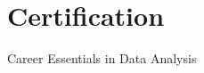 \documentclass{ExpressiveResume}
\begin{document}

\section{Certification}
 {Career Essentials in Data Analysis}{}{}{}
 {}{}
\end{document}
